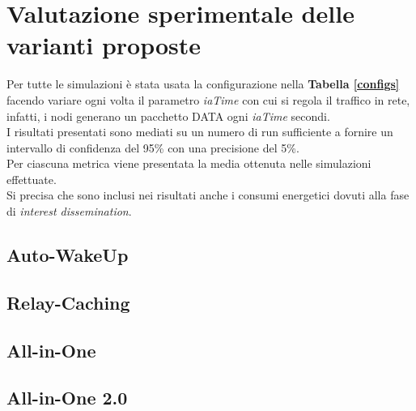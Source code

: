 \section{Valutazione sperimentale delle varianti proposte}
Per tutte le simulazioni è stata usata la configurazione nella \textbf{Tabella \ref{configs}} facendo variare ogni volta il parametro \textit{iaTime} con cui si regola il traffico in rete, infatti, i nodi generano un pacchetto DATA ogni \textit{iaTime} secondi.\\
I risultati presentati sono mediati su un numero di run sufficiente a fornire un intervallo di confidenza del 95\% con una precisione del 5\%. \\
Per ciascuna metrica viene presentata la media  ottenuta nelle simulazioni effettuate. \\
Si precisa che sono inclusi nei risultati anche i consumi energetici dovuti alla fase di \textit{interest dissemination}.


\subsection{Auto-WakeUp}

\newpage

\subsection{Relay-Caching}


\subsection{All-in-One}


\subsection{All-in-One 2.0}
